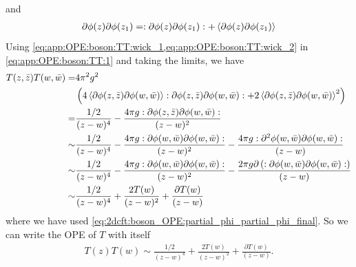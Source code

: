 \documentclass[10pt]{article}
\begin{document}
and
\begin{align}
    \partial\phi(z)\partial\phi(z_1)=:\partial\phi(z)\partial\phi(z_1):+\expval{\partial\phi(z)\partial\phi(z_1)}\label{eq:app:OPE:boson:TT:wick_2}
\end{align}
Using \cref{eq:app:OPE:boson:TT:wick_1,eq:app:OPE:boson:TT:wick_2} in \cref{eq:app:OPE:boson:TT:1} and taking the limits, we have
\begin{align}
    T(z,\bar{z})T(w,\bar{w})= & 4\pi^2 g^2\notag                                                                                                                                                                           \\
                              & \left(4\expval{\partial\phi(z,\bar{z})\partial\phi(w,\bar{w})}:\partial\phi(z,\bar{z})\partial\phi(w,\bar{w}):+2\expval{\partial\phi(z,\bar{z})\partial\phi(w,\bar{w})}^2\right)\notag     \\
    =                         & \frac{1/2}{(z-w)^4}-\frac{4\pi g:\partial\phi(z,\bar{z})\partial\phi(w,\bar{w}):}{(z-w)^2}\notag                                                                                           \\
    \sim                      & \frac{1/2}{(z-w)^4}-\frac{4\pi g:\partial\phi(w,\bar{w})\partial\phi(w,\bar{w}):}{(z-w)^2}-\frac{4\pi g:\partial^2\phi(w,\bar{w})\partial\phi(w,\bar{w}):}{(z-w)}\notag                    \\
    \sim                      & \frac{1/2}{(z-w)^4}-\frac{4\pi g:\partial\phi(w,\bar{w})\partial\phi(w,\bar{w}):}{(z-w)^2}-\frac{2\pi g\partial\left(:\partial\phi(w,\bar{w})\partial\phi(w,\bar{w}):\right)}{(z-w)}\notag \\
    \sim                      & \frac{1/2}{(z-w)^4}+\frac{2T(w)}{(z-w)^2}+\frac{\partial T(w)}{(z-w)}
\end{align}
where we have used \cref{eq:2dcft:boson_OPE:partial_phi_partial_phi_final}.
So we can write the OPE of $T$ with itself
\begin{align}
    T(z)T(w)\sim\frac{1/2}{(z-w)^4}+\frac{2T(w)}{(z-w)^2}+\frac{\partial T(w)}{(z-w)}.
\end{align}

\clearpage


\end{document}
